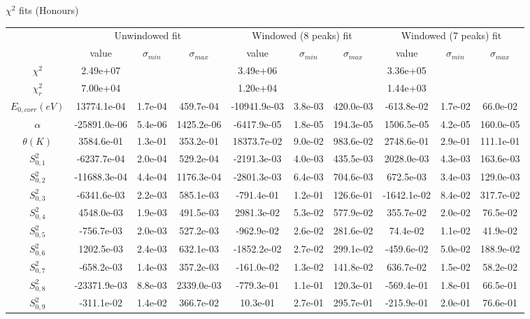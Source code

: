 \documentclass{article}
\begin{document}
\begin{landscape}
\begin{table}[ht]
\centering
$\chi^2$ fits (Honours)

\begin{tabular}{c|c|c|c|c|c|c|c|c|c}
\hline
&\multicolumn{3}{|c}{Unwindowed fit}&\multicolumn{3}{|c}{Windowed (8 peaks) fit}&\multicolumn{3}{|c}{Windowed (7 peaks) fit}\\
& value & $\sigma_{min}$ & $\sigma_{max}$& value & $\sigma_{min}$ & $\sigma_{max}$& value & $\sigma_{min}$ & $\sigma_{max}$\\
\hline
$\chi^2$   & 2.49e+07 & & & 3.49e+06 & & & 3.36e+05 & & \\
$\chi^2_r$ & 7.00e+04 & & & 1.20e+04 & & & 1.44e+03 & & \\
\hline
$E_{0,corr} (eV)$& 13774.1e-04 & 1.7e-04 & 459.7e-04 & -10941.9e-03 & 3.8e-03 & 420.0e-03 & -613.8e-02 & 1.7e-02 & 66.0e-02 \\
$\alpha $       & -25891.0e-06 & 5.4e-06 & 1425.2e-06 & -6417.9e-05 & 1.8e-05 & 194.3e-05 & 1506.5e-05 & 4.2e-05 & 160.0e-05 \\
$\theta (K) $   & 3584.6e-01 & 1.3e-01 & 353.2e-01 & 18373.7e-02 & 9.0e-02 & 983.6e-02 & 2748.6e-01 & 2.9e-01 & 111.1e-01 \\
$S^2_{0,1}$& -6237.7e-04 & 2.0e-04 & 529.2e-04 & -2191.3e-03 & 4.0e-03 & 435.5e-03 & 2028.0e-03 & 4.3e-03 & 163.6e-03 \\
$S^2_{0,2}$& -11688.3e-04 & 4.4e-04 & 1176.3e-04 & -2801.3e-03 & 6.4e-03 & 704.6e-03 & 672.5e-03 & 3.4e-03 & 129.0e-03 \\
$S^2_{0,3}$& -6341.6e-03 & 2.2e-03 & 585.1e-03 & -791.4e-01 & 1.2e-01 & 126.6e-01 & -1642.1e-02 & 8.4e-02 & 317.7e-02 \\
$S^2_{0,4}$& 4548.0e-03 & 1.9e-03 & 491.5e-03 & 2981.3e-02 & 5.3e-02 & 577.9e-02 & 355.7e-02 & 2.0e-02 & 76.5e-02 \\
$S^2_{0,5}$& -756.7e-03 & 2.0e-03 & 527.2e-03 & -962.9e-02 & 2.6e-02 & 281.6e-02 & 74.4e-02 & 1.1e-02 & 41.9e-02 \\
$S^2_{0,6}$& 1202.5e-03 & 2.4e-03 & 632.1e-03 & -1852.2e-02 & 2.7e-02 & 299.1e-02 & -459.6e-02 & 5.0e-02 & 188.9e-02 \\
$S^2_{0,7}$& -658.2e-03 & 1.4e-03 & 357.2e-03 & -161.0e-02 & 1.3e-02 & 141.8e-02 & 636.7e-02 & 1.5e-02 & 58.2e-02 \\
$S^2_{0,8}$& -23371.9e-03 & 8.8e-03 & 2339.0e-03 & -779.3e-01 & 1.1e-01 & 120.3e-01 & -569.4e-01 & 1.8e-01 & 66.5e-01 \\
$S^2_{0,9}$& -311.1e-02 & 1.4e-02 & 366.7e-02 & 10.3e-01 & 2.7e-01 & 295.7e-01 & -215.9e-01 & 2.0e-01 & 76.6e-01 \\

\end{tabular}
\end{table}
\end{landscape}
\end{document}
